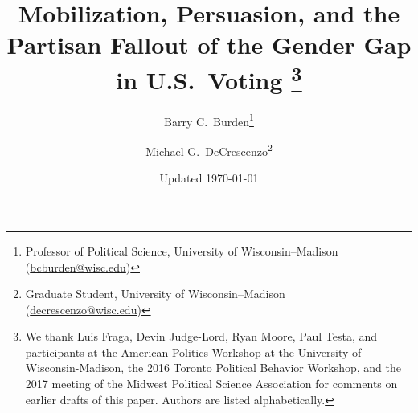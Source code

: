 \documentclass[12pt
               ,final
               ]{article}
\begin{document}
\title{Mobilization, Persuasion, and the Partisan Fallout of the Gender Gap in U.S.\ Voting%
  \thanks{We thank Luis Fraga, Devin Judge-Lord, Ryan Moore, Paul Testa, and participants at the American Politics Workshop at the University of Wisconsin-Madison, the 2016 Toronto Political Behavior Workshop, and the 2017 meeting of the Midwest Political Science Association for comments on earlier drafts of this paper. Authors are listed alphabetically.}
}

\author{}
\author{Barry C.\ Burden\footnote{Professor of Political Science, University of Wisconsin--Madison (\url{bcburden@wisc.edu})} 
\and 
Michael G.\ DeCrescenzo\footnote{Graduate Student, University of Wisconsin--Madison (\url{decrescenzo@wisc.edu})}}

\date{Updated \today}
\maketitle




\hypersetup{pageanchor=false}
\thispagestyle{empty}




\listoftodos









\newpage


\thispagestyle{empty}
\end{document}

